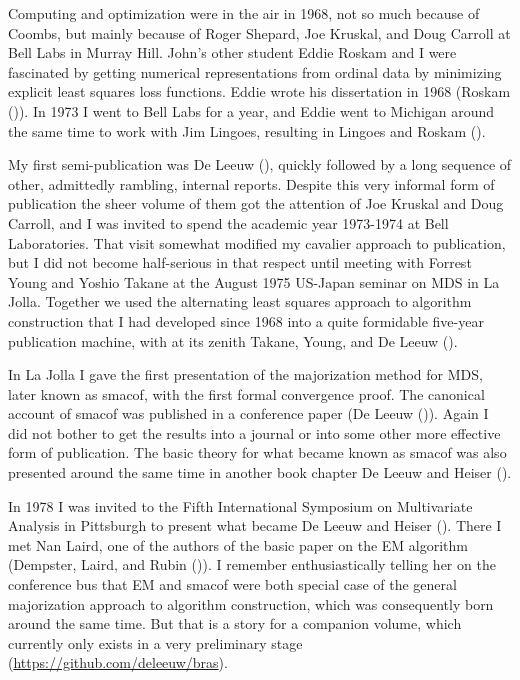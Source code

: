 \documentclass[
  12pt,
]{book}
\begin{document}
Computing and optimization were in the air in 1968, not so much because
of Coombs, but mainly because of Roger Shepard, Joe Kruskal, and Doug
Carroll at Bell Labs in Murray Hill. John's other student Eddie Roskam
and I were fascinated by getting numerical representations from ordinal
data by minimizing explicit least squares loss functions. Eddie wrote
his dissertation in 1968 (Roskam ()). In 1973 I went to Bell Labs for a
year, and Eddie went to Michigan around the same time to work with Jim
Lingoes, resulting in Lingoes and Roskam ().

My first semi-publication was De Leeuw (), quickly followed by a long
sequence of other, admittedly rambling, internal reports. Despite this very
informal form of publication the sheer volume of them got the attention
of Joe Kruskal and Doug Carroll, and I was invited to spend the academic
year 1973-1974 at Bell Laboratories. That visit somewhat modified my
cavalier approach to publication, but I did not become half-serious in
that respect until meeting with Forrest Young and Yoshio Takane at the
August 1975 US-Japan seminar on MDS in La Jolla. Together we used the
alternating least squares approach to algorithm construction that I had
developed since 1968 into a quite formidable five-year publication
machine, with at its zenith Takane, Young, and De Leeuw ().

In La Jolla I gave the first presentation of the majorization method for
MDS, later known as smacof, with the first formal convergence proof. The
canonical account of smacof was published in a conference paper (De Leeuw ()). Again I did not bother to get the results into a journal or into some other more effective form of publication. The basic theory for what became known as
smacof was also presented around the same time in another book chapter
De Leeuw and Heiser ().

In 1978 I was invited to the Fifth International Symposium on
Multivariate Analysis in Pittsburgh to present what became
De Leeuw and Heiser (). There I met Nan Laird, one of the authors of the
basic paper on the EM algorithm (Dempster, Laird, and Rubin ()). I remember
enthusiastically telling her on the conference bus that EM and smacof
were both special case of the general majorization approach to algorithm
construction, which was consequently born around the same time. But that
is a story for a companion volume, which currently only exists in a very
preliminary stage (\url{https://github.com/deleeuw/bras}).
\end{document}
